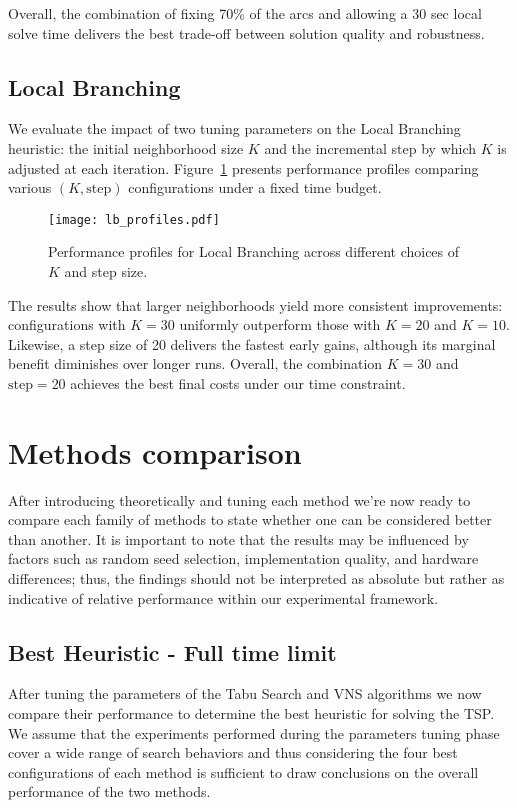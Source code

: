 Overall, the combination of fixing 70\% of the arcs and allowing a 30 sec local solve time delivers the best trade-off between solution quality and robustness.

\subsection{Local Branching}
\label{ssec:local-branch}

We evaluate the impact of two tuning parameters on the Local Branching heuristic: the initial neighborhood size \(K\) and the incremental step by which \(K\) is adjusted at each iteration. Figure~\ref{fig:lb-profiles} presents performance profiles comparing various \((K,\text{step})\) configurations under a fixed time budget.

\begin{figure}[H]
  \centering
  \texttt{[image: lb\_profiles.pdf]}
  \caption{Performance profiles for Local Branching across different choices of \(K\) and step size.}
  \label{fig:lb-profiles}
\end{figure}

The results show that larger neighborhoods yield more consistent improvements: configurations with \(K=30\) uniformly outperform those with \(K=20\) and \(K=10\). Likewise, a step size of 20 delivers the fastest early gains, although its marginal benefit diminishes over longer runs. Overall, the combination \(K=30\) and \(\text{step}=20\) achieves the best final costs under our time constraint.  

\section{Methods comparison}

After introducing theoretically and tuning each method we're now ready to compare each family of methods to state whether one can be considered better than another. It is important to note that the results may be influenced by factors such as random seed selection, implementation quality, and hardware differences; thus, the findings should not be interpreted as absolute but rather as indicative of relative performance within our experimental framework. 

\subsection{Best Heuristic - Full time limit}

After tuning the parameters of the Tabu Search and VNS algorithms we now compare their performance to determine the best heuristic for solving the TSP. We assume that the experiments performed during the parameters tuning phase cover a wide range of search behaviors and thus considering the four best configurations of each method is sufficient to draw conclusions on the overall performance of the two methods.


